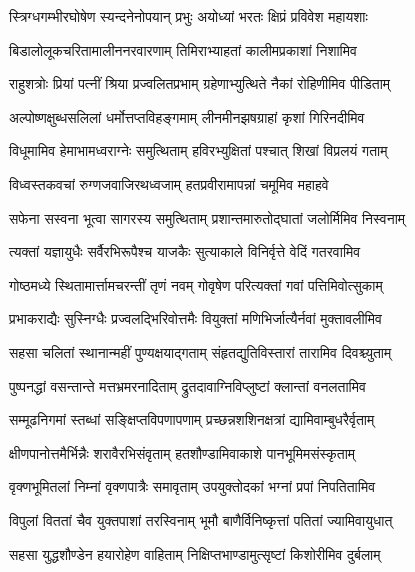 
\twolineshloka
{स्त्रिग्धगम्भीरघोषेण स्यन्दनेनोपयान् प्रभुः}
{अयोध्यां भरतः क्षिप्रं प्रविवेश महायशाः} %

\twolineshloka
{बिडालोलूकचरितामालीननरवारणाम्}
{तिमिराभ्याहतां कालीमप्रकाशां निशामिव} %

\twolineshloka
{राहुशत्रोः प्रियां पत्नीं श्रिया प्रज्वलितप्रभाम्}
{ग्रहेणाभ्युत्थिते नैकां रोहिणीमिव पीडिताम्} %

\twolineshloka
{अल्पोष्णक्षुब्धसलिलां धर्मोत्तप्तविहङ्गमाम्}
{लीनमीनझषग्राहां कृशां गिरिनदीमिव} %

\twolineshloka
{विधूमामिव हेमाभामध्वराग्नेः समुत्थिताम्}
{हविरभ्युक्षितां पश्चात् शिखां विप्रलयं गताम्} %

\twolineshloka
{विध्वस्तकवचां रुग्णजवाजिरथध्वजाम्}
{हतप्रवीरामापन्नां चमूमिव महाहवे} %

\twolineshloka
{सफेना सस्वना भूत्वा सागरस्य समुत्थिताम्}
{प्रशान्तमारुतोद्घातां जलोर्मिमिव निस्वनाम्} %

\twolineshloka
{त्यक्तां यज्ञायुधैः सर्वैरभिरूपैश्च याजकैः}
{सुत्याकाले विनिर्वृत्ते वेदिं गतरवामिव} %

\twolineshloka
{गोष्ठमध्ये स्थितामार्त्तामचरन्तीं तृणं नवम्}
{गोवृषेण परित्यक्तां गवां पत्तिमिवोत्सुकाम्} %

\twolineshloka
{प्रभाकराद्यैः सुस्निग्धैः प्रज्वलद्भिरिवोत्तमैः}
{वियुक्तां मणिभिर्जात्यैर्नवां मुक्तावलीमिव} %

\twolineshloka
{सहसा चलितां स्थानान्महीं पुण्यक्षयाद्गताम्}
{संहृतद्युतिविस्तारां तारामिव दिवश्च्युताम्} %

\twolineshloka
{पुष्पनद्धां वसन्तान्ते मत्तभ्रमरनादिताम्}
{द्रुतदावाग्निविप्लुष्टां क्लान्तां वनलतामिव} %

\twolineshloka
{सम्मूढनिगमां स्तब्धां सङ्क्षिप्तविपणापणाम्}
{प्रच्छन्नशशिनक्षत्रां द्यामिवाम्बुधरैर्वृताम्} %

\twolineshloka
{क्षीणपानोत्तमैर्भिन्नैः शरावैरभिसंवृताम्}
{हतशौण्डामिवाकाशे पानभूमिमसंस्कृताम्} %

\twolineshloka
{वृक्णभूमितलां निम्नां वृक्णपात्रैः समावृताम्}
{उपयुक्तोदकां भग्नां प्रपां निपतितामिव} %

\twolineshloka
{विपुलां विततां चैव युक्तपाशां तरस्विनाम्}
{भूमौ बाणैर्विनिष्कृत्तां पतितां ज्यामिवायुधात्} %

\twolineshloka
{सहसा युद्धशौण्डेन हयारोहेण वाहिताम्}
{निक्षिप्तभाण्डामुत्सृष्टां किशोरीमिव दुर्बलाम्} %


